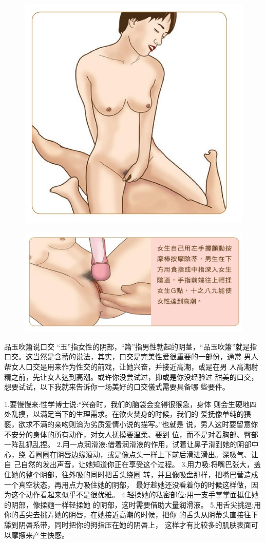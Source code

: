 \documentclass[12pt,UTF8]{ctexbook}
\begin{document}
\begin{figure}[htbp]
	\centering
	\includegraphics[width=0.7\linewidth]{17}
	\caption{}
	\label{fig:1}
\end{figure}

\begin{figure}[htbp]
	\centering
	\includegraphics[width=0.7\linewidth]{18}
	\caption{}
	\label{fig:1}
\end{figure}

品玉吹簫说口交
“玉”指女性的阴部，“簫”指男性勃起的阴茎，“品玉吹簫”就是指
口交。这当然是含蓄的说法，其实，口交是完美性爱很重要的一部份，通常
男人帮女人口交是用来作为性交的前戏，让她兴奋，并接近高潮，或是在男
人高潮射精之前，先让女人达到高潮。或许你没尝试过，抑或是你没经验过
甜美的口交，想要试试，以下我就来告诉你一场美好的口交儀式需要具备哪
些要件。

1.要慢慢来:性学博士说:“兴奋时，我们的脑袋会变得很猴急，身体
则会生硬地四处乱摸，以满足当下的生理需求。在欲火焚身的时候，我们的
爱抚像单纯的猥褻，欲求不满的亲吻则淪为劣质爱情小说的描写。”也就是
说，男人这时要留意你不安分的身体的所有动作，对女人抚摸要温柔、要到
位，而不是对着胸部、臀部一阵乱抓乱捏。
2.用一点润滑液:借着润滑液的作用，试着让鼻子滑到她的阴部中心，绕
着圈圈在阴唇边缘滾动，或是像点头一样上下前后滑进滑出。深吸气、让自
己自然的发出声音，让她知道你正在享受这个过程。
3.用力吸:将嘴巴张大，盖住她的整个阴部，往外吸的同时把舌头绕圈
转，并且像吸盘那样，把嘴巴营造成一个真空状态，再用点力吸住她的阴部，
最好趁她还没看着你的时候这样做，因为这个动作看起来似乎不是很优雅。
4.轻揉她的私密部位:用一支手掌掌面抵住她的阴部，像揉麵一样轻揉她
的阴部，这时需要借助大量润滑液。
5.用舌尖挑逗:用你的舌尖去挑弄她的阴唇，在她接近高潮的时候，把你
的舌头从阴蒂头直接往下舔到阴唇系带，同时把你的拇指压在她的阴唇上，
这样才有比较多的肌肤表面可以摩擦来产生快感。
\end{document}
